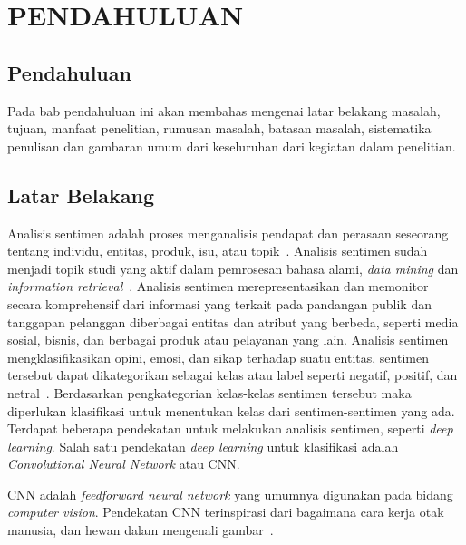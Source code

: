 \pagestyle{fancy}
\rhead{}
\lhead{}
\setcounter{page}{1}
\renewcommand\thepage{\Roman{chapter}-\arabic{page}}
\chapter{PENDAHULUAN}

\section{Pendahuluan}
Pada bab pendahuluan ini akan membahas mengenai latar belakang masalah, tujuan, manfaat
penelitian, rumusan masalah, batasan masalah, sistematika penulisan dan gambaran umum dari
keseluruhan dari kegiatan dalam penelitian.

\section{Latar Belakang}
Analisis sentimen adalah proses menganalisis pendapat dan perasaan seseorang tentang individu, entitas,
produk, isu, atau topik~\citep{Almaghrabi2020}. Analisis sentimen sudah menjadi topik studi yang aktif 
dalam pemrosesan bahasa alami, \emph{data mining} dan \emph{information retrieval}~\citep{Alshuwaier2022}. 
Analisis sentimen merepresentasikan dan memonitor secara komprehensif dari informasi yang terkait pada 
pandangan publik dan tanggapan pelanggan diberbagai entitas dan atribut yang berbeda, seperti 
media sosial, bisnis, dan berbagai produk atau pelayanan yang lain. Analisis sentimen mengklasifikasikan
opini, emosi, dan sikap terhadap suatu entitas, sentimen tersebut dapat dikategorikan sebagai kelas
atau label seperti negatif, positif, dan netral~\citep{Alshuwaier2022}. Berdasarkan pengkategorian 
kelas-kelas sentimen tersebut maka diperlukan klasifikasi untuk menentukan kelas dari sentimen-sentimen
yang ada. Terdapat beberapa pendekatan untuk melakukan analisis sentimen, seperti \emph{deep learning}.
Salah satu pendekatan \emph{deep learning} untuk klasifikasi adalah \emph{Convolutional Neural Network} 
atau CNN\@.

CNN adalah \emph{feedforward neural network} yang umumnya digunakan pada bidang \emph{computer vision}.
Pendekatan CNN terinspirasi dari bagaimana cara kerja otak manusia, dan hewan dalam mengenali
gambar~\citep{Zhang2018}. \newpage 

\cfoot{}

